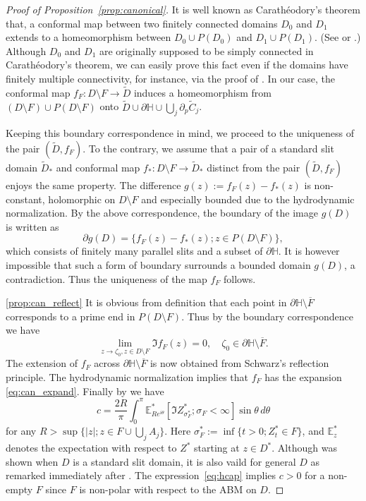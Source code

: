 \documentclass[preprint,12pt]{elsarticle}
\theoremstyle{definition}
\newcommand{\mean}[3]{\mathbb{E}^{#1}_{#2}\left[ #3 \right]}
\newcommand{\uhp}{\mathbb{H}}
\begin{document}
\begin{proof}[Proof of Proposition~\ref{prop:canonical}]
It is well known as Carath\'eodory's theorem that, a conformal map
between two finitely connected domains $D_0$ and $D_1$
extends to a homeomorphism between $D_0 \cup P(D_0)$ and $D_1 \cup P(D_1)$.
(See \cite[Theorem~IX.1]{Ts59} or \cite[Theorem~14.3.4]{Co95}.)
Although $D_0$ and $D_1$ are originally supposed to be simply connected
in Carath\'eodory's theorem,
we can easily prove this fact even if the domains have finitely multiple connectivity,
for instance, via the proof of \cite[Theorem~15.3.4]{Co95}.
In our case, the conformal map $f_F \colon D \setminus F \to \tilde{D}$
induces a homeomorphism from
$(D \setminus F) \cup P(D \setminus F)$ onto
$\tilde{D} \cup \partial \uhp \cup \bigcup_j \partial_p \tilde{C}_j$.

Keeping this boundary correspondence in mind, we proceed to
the uniqueness of the pair $(\tilde{D}, f_F)$.
To the contrary, we assume that a pair of a standard slit domain $\tilde{D}_*$ and
conformal map $f_{\ast} \colon D \setminus F \to \tilde{D}_*$
distinct from the pair $(\tilde{D}, f_F)$ enjoys the same property.
The difference $g(z):=f_F(z)-f_*(z)$ is non-constant, holomorphic
on $D \setminus F$ and especially bounded due to the hydrodynamic normalization.
By the above correspondence, the boundary of the image $g(D)$
is written as
\[
\partial g(D)=\{ f_F(z) - f_*(z); z \in P(D \setminus F)\},
\]
which consists of finitely many parallel slits and a subset of $\partial \uhp$.
It is however impossible that such a form of boundary surrounds
a bounded domain $g(D)$, a contradiction.
Thus the uniqueness of the map $f_F$ follows.

\noindent
\eqref{prop:can_reflect}
It is obvious from definition that each point
in $\partial \uhp \setminus \overline{F}$
corresponds to a prime end in $P(D \setminus F)$.
Thus by the boundary correspondence we have
\[
\lim_{z \to \zeta_0, z \in D \setminus F} \Im f_F(z)=0,
\quad \zeta_0 \in \partial \uhp \setminus \overline{F}.
\]
The extension of $f_F$ across $\partial \uhp \setminus \overline{F}$
is now obtained from Schwarz's reflection principle.
The hydrodynamic normalization implies that
$f_F$ has the expansion \eqref{eq:can_expand}.
Finally by \cite[(A.20)]{CF18} we have
\begin{equation} \label{eq:hcap}
c=\frac{2R}{\pi}\int_0^{\pi}
\mean{*}{Re^{i\theta}}{\Im Z^*_{\sigma^*_F}; \sigma_F<\infty} \sin\theta \,d\theta
\end{equation}
for any $R >\sup\{\lvert z \rvert; z \in F \cup \bigcup_j A_j\}$.
Here $\sigma^*_F:=\inf\{t>0; Z^*_t \in F\}$, and $\mathbb{E}^*_z$ denotes
the expectation with respect to $Z^*$ starting at $z \in D^*$.
Although \cite[(A.20)]{CF18} was shown when $D$ is a standard slit domain,
it is also vaild for general $D$ as remarked immediately after \cite[(A.21)]{CF18}.
The expression~\eqref{eq:hcap} implies $c>0$ for a non-empty $F$
since $F$ is non-polar with respect to the ABM on $D$.
\end{proof}
\end{document}
